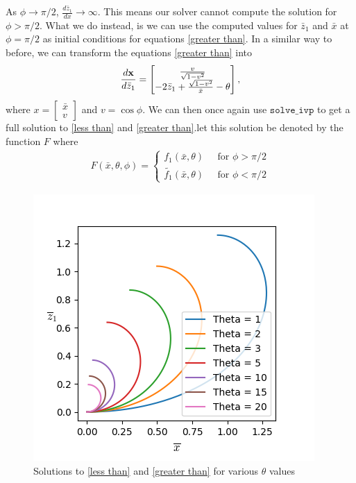 As $\phi \rightarrow \pi/2$, $\frac{d\bar{z}_1}{dx} \rightarrow \infty$. This means our solver cannot compute the solution for $\phi> \pi/2$. What we do instead, is we can use the computed values for $\bar{z}_1$ and $\bar{x}$ at $\phi=\pi/2$ as initial conditions for equations \ref{greater than}. In a similar way to before, we can transform the equations \ref{greater than} into
\begin{align}
     \frac{d\bf{x}}{d\bar{z}_1}=\begin{bmatrix}
           \frac{v}{\sqrt{1-v^2}} \\
           -2\bar{z}_1 + \frac{\sqrt{1-v^2}}{\bar{x}}-\theta \\
         \end{bmatrix},
\end{align}
where $ {x} = \begin{bmatrix}
    \bar{x}\\v
\end{bmatrix}$ and $v=\cos\phi$. We can then once again use $\texttt{solve\_ivp}$ to get a full solution to \ref{less than} and \ref{greater than}.let this solution be denoted by the function $F$ where
\begin{align}
    F(\bar{x},\theta,\phi)= \begin{cases}
        f_1(\bar{x},\theta) \;\;\;\;\; \text{for } \phi>\pi/2\\
        \tilde{f_1}(\bar{x},\theta) \;\;\;\;\; \text{for } \phi<\pi/2
    \end{cases}
\end{align}

\begin{figure}[hb]
    \centering
    \includegraphics[width=0.85\linewidth]{WriteUp/images/top and bottom curve.png}
    \caption{Solutions to \ref{less than} and \ref{greater than} for various $\theta$ values}
    \label{fig:10}
\end{figure}